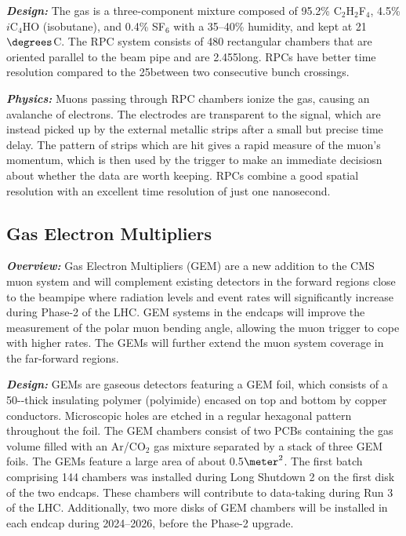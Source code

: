\textbf{\textit{Design:}}
The gas is a three-component mixture composed of 95.2\% C$_2$H$_2$F$_4$, 4.5\% $i$C$_4$HO (isobutane), and 0.4\% SF$_6$ with a 35--40\% humidity, and kept at 21$\degrees$C.
The RPC system consists of 480 rectangular chambers that are oriented parallel to the beam pipe and are 2.455\mm long.
RPCs have better time resolution compared to the 25\ns between two consecutive \pp bunch crossings. 


\textbf{\textit{Physics:}}
Muons passing through RPC chambers ionize the gas, causing an avalanche of electrons.
The electrodes are transparent to the signal, which are instead picked up by the external metallic strips after a small but precise time delay.
The pattern of strips which are hit gives a rapid measure of the muon's momentum, which is then used by the trigger to make an immediate decisiosn about whether the data are worth keeping.
RPCs combine a good spatial resolution with an excellent time resolution of just one nanosecond. 

\subsection{Gas Electron Multipliers}
\label{sec:gem}

\textbf{\textit{Overview:}}
Gas Electron Multipliers (GEM) are a new addition to the CMS muon system and will complement existing detectors in the forward regions close to the beampipe where radiation levels and event rates will significantly increase during Phase-2 of the LHC.
GEM systems in the endcaps will improve the measurement of the polar muon bending angle, allowing the muon trigger to cope with higher rates.
The GEMs will further extend the muon system coverage in the far-forward regions. 

\textbf{\textit{Design:}}
GEMs are gaseous detectors featuring a GEM foil, which consists of a 50-\mumns-thick insulating polymer (polyimide) encased on top and bottom by copper conductors.
Microscopic holes are etched in a regular hexagonal pattern throughout the foil.
The GEM chambers consist of two PCBs containing the gas volume filled with an Ar/CO$_2$ gas mixture separated by a stack of three GEM foils.
The GEMs feature a large area of about 0.5$\meter^2$.
The first batch comprising 144 chambers was installed during Long Shutdown 2 on the first disk of the two endcaps.
These chambers will contribute to data-taking during Run 3 of the LHC.
Additionally, two more disks of GEM chambers will be installed in each endcap during 2024--2026, before the Phase-2 upgrade.


